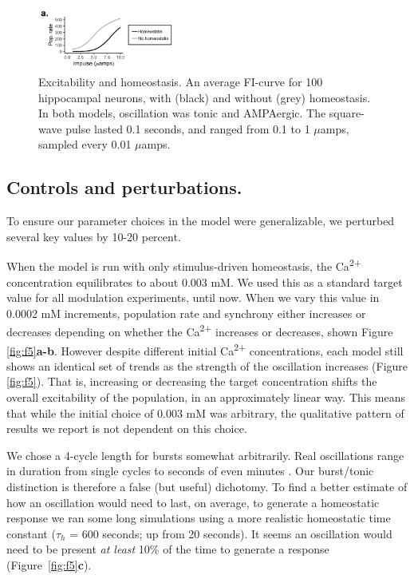\documentclass{article}
\begin{document}
\begin{figure}
\centering
\includegraphics[width=0.4\textwidth]{fig4.png}
\caption{\label{fig:f4}
Excitability and homeostasis. An average FI-curve for 100 hippocampal neurons, with (black) and without (grey) homeostasis. In both models, oscillation was tonic and AMPAergic. The square-wave pulse lasted 0.1 seconds, and ranged from 0.1 to 1 $\mu$amps, sampled every 0.01 $\mu$amps.
}
\end{figure}

\subsection*{Controls and perturbations.}
To ensure our parameter choices in the model were generalizable, we perturbed several key values by 10-20 percent.

When the model is run with only stimulus-driven homeostasis, the Ca\textsuperscript{2+} concentration equilibrates to about 0.003 mM. We used this as a standard target value for all modulation experiments, until now. When we vary this value in 0.0002 mM increments, population rate and synchrony either increases or decreases depending on whether the Ca\textsuperscript{2+} increases or decreases, shown Figure \ref{fig:f5}\textbf{a-b}. However despite different initial Ca\textsuperscript{2+} concentrations, each model still shows an identical set of trends as the strength of the oscillation increases (Figure \ref{fig:f5}). That is, increasing or decreasing the target concentration shifts the overall excitability of the population, in an approximately linear way. This means that while the initial choice of 0.003 mM was arbitrary, the qualitative pattern of results we report is not dependent on this choice.

We chose a 4-cycle length for bursts somewhat arbitrarily. Real oscillations range in duration from single cycles to seconds of even minutes \cite{Lundqvist2016,vanEde2018}. Our burst/tonic distinction is therefore a false (but useful) dichotomy. To find a better estimate of how an oscillation would need to last, on average, to generate a homeostatic response we ran some long simulations using a more realistic homeostatic time constant ($\tau_h$ = 600 seconds; up from 20 seconds). It seems an oscillation would need to be present \textit{at least} 10\% of the time to generate a response (Figure~\ref{fig:f5}\textbf{c}). 
\end{document}
